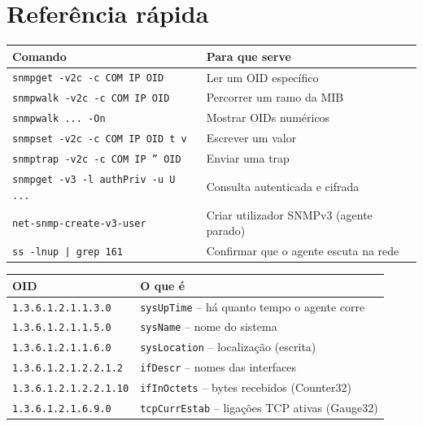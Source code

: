 \documentclass[11pt,a4paper]{article}
\begin{document}
\section{Referência rápida}

\begin{center}
\begin{tabular}{@{}ll@{}}
\toprule
\textbf{Comando} & \textbf{Para que serve} \\
\midrule
\texttt{snmpget -v2c -c COM IP OID} & Ler um OID específico \\
\texttt{snmpwalk -v2c -c COM IP OID} & Percorrer um ramo da MIB \\
\texttt{snmpwalk ... -On} & Mostrar OIDs numéricos \\
\texttt{snmpset -v2c -c COM IP OID t v} & Escrever um valor \\
\texttt{snmptrap -v2c -c COM IP '' OID} & Enviar uma trap \\
\texttt{snmpget -v3 -l authPriv -u U ...} & Consulta autenticada e cifrada \\
\texttt{net-snmp-create-v3-user} & Criar utilizador SNMPv3 (agente parado) \\
\texttt{ss -lnup | grep 161} & Confirmar que o agente escuta na rede \\
\bottomrule
\end{tabular}
\end{center}

\vspace{0.3cm}

\begin{center}
\begin{tabular}{@{}ll@{}}
\toprule
\textbf{OID} & \textbf{O que é} \\
\midrule
\texttt{1.3.6.1.2.1.1.3.0} & \texttt{sysUpTime} -- há quanto tempo o agente corre \\
\texttt{1.3.6.1.2.1.1.5.0} & \texttt{sysName} -- nome do sistema \\
\texttt{1.3.6.1.2.1.1.6.0} & \texttt{sysLocation} -- localização (escrita) \\
\texttt{1.3.6.1.2.1.2.2.1.2} & \texttt{ifDescr} -- nomes das interfaces \\
\texttt{1.3.6.1.2.1.2.2.1.10} & \texttt{ifInOctets} -- bytes recebidos (Counter32) \\
\texttt{1.3.6.1.2.1.6.9.0} & \texttt{tcpCurrEstab} -- ligações TCP ativas (Gauge32) \\
\bottomrule
\end{tabular}
\end{center}
\end{document}
